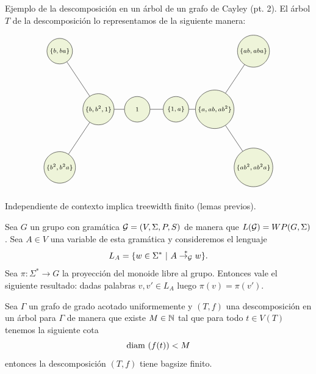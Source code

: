 \documentclass[aspectratio=169, 11pt]{beamer}
\begin{document}
	\begin{frame}[fragile]{Ejemplo de la descomposición en un árbol de un grafo de Cayley (pt. 2).}
		El árbol $T$ de la descomposición lo representamos de la siguiente manera:

	\[
			\begin{tikzpicture}[scale=0.8, V/.style = {circle, draw,align= center, minimum size=0.5cm,
			minimum size=3em,inner sep=2,
			fill=applegreen!15,font=\scriptsize	},fill fraction/.style={path picture={
				\fill[#1] 
				(path picture bounding box.south) rectangle
				(path picture bounding box.north west);
		}},
		fill fraction/.default=gray!50
		]
		\node[align=center] at (2, -6) {};
		\begin{scope}[nodes=V,xshift=4.5cm, yshift=-4cm]
			\node (1) at (0,0)  {$\{ b,b^2,1 \}$};
			\node (2) at (2,0)  {$1$};
			\node (3) at (4,0)  {$\{ 1,a \}$};
			\node (4) at (-2,3)     {$\{ b,ba \}$};
			\node (5) at (-2,-3)   {$\{b^2,b^2a\}$};
			\node (6) at (6,0)  {$\{ a,ab,ab^2 \}$};
			
			\node (9) at (8,3)  {$\{ab,aba\}$};
			\node (10) at (8,-3)  {$\{ ab^2, ab^2a \}$};
			
		\end{scope}
		
		
		\draw (1) edge[-] (2);
		\draw (2) edge[-] (3);
		\draw (1) edge[-] (5);
		\draw (1) edge[-] (4);
		\draw (3) edge[-] (6);
		\draw (6) edge[-] (9);
		\draw (6) edge[-] (10);
	\end{tikzpicture}
	\]
	\end{frame}

	
	\begin{frame}[fragile]{Independiente de contexto implica treewidth finito (lemas previos).}
		\begin{lema}[1]
			Sea $G$ un grupo \ic con gramática ${\cal G} = (V, \Sigma, P, S)$ de manera que $L({\cal G}) = WP(G,\Sigma)$.
			Sea $A \in V$ una variable de esta gramática y consideremos el lenguaje
			\[
			L_A = \{ w \in \Sigma^*  \ | \ A \overset{*}{\to_{\cal G}} w  \}.
			\]
			Sea $\pi:\Sigma^* \to G$ la proyección del monoide libre al grupo.
			Entonces vale el siguiente resultado:
			dadas palabras $v,v' \in L_{A}$ luego $\pi(v) = \pi(v')$.
		\end{lema}

		\begin{lema}[2]
			Sea $\Gamma$ un grafo de grado acotado uniformemente y 
			$(T,f)$ una descomposición en un árbol para $\Gamma$ de manera que existe $M \in \mathbb{N}$ tal que para todo $t \in V(T)$ tenemos la siguiente cota
			\[
				  \text{diam}\ (f(t)) < M
			\]   
			entonces la descomposición $(T,f)$ tiene bagsize finito.
		\end{lema}
	\end{frame}
\end{document}

